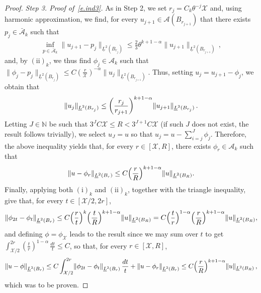 \documentclass[11pt]{article} %
\numberwithin{equation}{section}
\theoremstyle{definition}
\let\originalleft\left
\let\originalright\right
\renewcommand{\left}{\mathopen{}\mathclose\bgroup\originalleft}
\renewcommand{\right}{\aftergroup\egroup\originalright}
\newcommand*{\N}{\ensuremath{\mathbb{N}}}
\newcommand{\X}{\mathcal{X}}
\newcommand{\A}{\mathcal{A}}
\newcommand{\Ahom}{\bar{\A}}
\begin{document}
\begin{proof}
\emph{Step 3. Proof of~\eqref{e.ind3}.} As in Step 2, we set $r_j = C_k \theta^{-j} \X$ and, using harmonic approximation, we find, for every $u_{j+1} \in \A(B_{r_{j+1}})$ that there exists $p_j \in \Ahom_k$ such that 
\begin{align*}  
\inf_{p \in \Ahom_k} \| u_{j+1} - p_{j} \|_{\underline{L}^2(B_{r_{j}})} 
\leq 
\frac23 
 \theta^{k+1-\alpha} 
  \| u_{j+1} \|_{\underline{L}^2(B_{r_{j+1}})} 
\,,
\end{align*}
and, by $\mathrm{(ii)}_{k}$, we thus find $\phi_j \in \A_{k}$ such that $\| \phi_j -p_j  \|_{\underline{L}^2(B_{r_{j}})} \leq C ( \frac{r}{\X} )^{-\alpha} \| u_j  \|_{\underline{L}^2(B_{r_{j+1}})} $. Thus, setting $u_{j} = u_{j+1} - \phi_{j}$, we obtain that 
\begin{align*}  
\| u_{j} \|_{\underline{L}^2(B_{r_{j}})} 
\leq 
\left( \frac{r_j}{r_{j+1}} \right)^{k+1-\alpha}
\| u_{j+1} \|_{\underline{L}^2(B_{r_{j}})} 
\,.
\end{align*}
Letting $J \in \N$ be such that $3^{J} C \X \leq R < 3^{J+1} C \X$ (if such $J$ does not exist, the result follows trivially), we select $u_J = u$ so that $u_j = u - \sum_{i=j}^{J} \phi_j$. Therefore, the above inequality yields that, for every $r\in [\X,R]$, there exists $\phi_r \in \A_k$ such that 
\begin{align*}  
 \| u - \phi_r \|_{\underline{L}^2(B_{r})} 
\leq C 
\left( \frac{r}{R} \right)^{k+1-\alpha}
\| u \|_{\underline{L}^2(B_{R})} 
.
\end{align*}
Finally, applying both $\mathrm{(i)}_{k}$ and $\mathrm{(ii)}_{k}$, together with the triangle inequality, give that, for every $t \in [\X/2,2r]$, 
\begin{align*}  
\left\| \phi_{2t} - \phi_t \right\|_{\underline{L}^2(B_{r})} 
\leq 
C \Bigl(\frac{r}{t}\Bigr)^{k} 
\Bigl( \frac{t}{R} \Bigr)^{k+1-\alpha} \| u \|_{\underline{L}^2(B_{R})} 
=
C 
\Bigl( \frac{t}{r} \Bigr)^{1-\alpha}
\Bigl( \frac{r}{R} \Bigr)^{k+1-\alpha} \| u \|_{\underline{L}^2(B_{R})} ,
\end{align*}
and defining $\phi = \phi_\X$ leads to the result since we may sum over $t$ to get $ \int_{\X/2}^{2r} ( \frac{t}{r})^{1-\alpha} \, \frac{dt}{t} \leq C$, so that, for every $r \in [\X,R]$, 
\begin{align*}  
\left\| u - \phi \right\|_{\underline{L}^2(B_{r})} \leq C \int_{\X/2}^{2r} \left\| \phi_{2t} - \phi_{t} \right\|_{\underline{L}^2(B_{r})} \, \frac{dt}{t}+ \left\| u - \phi_r \right\|_{\underline{L}^2(B_{r})}
\leq C 
\Bigl( \frac{r}{R} \Bigr)^{k+1-\alpha} 
\| u \|_{\underline{L}^2(B_{R})} 
\,,
\end{align*}
which was to be proven. 


\end{proof}
\end{document}
